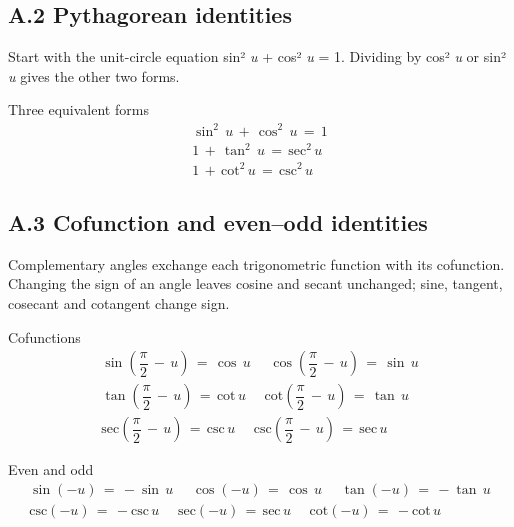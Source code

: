 \documentclass[11pt]{article}
\begin{document}
\begin{keepsection}
\section{A.2 Pythagorean identities}

Start with the unit-circle equation sin² \textit{u} + cos² \textit{u} = 1. Dividing by cos² \textit{u} or sin² \textit{u} gives the other two forms.

\begin{equationcard}{Three equivalent forms}
\[ \begin{gathered} \sin ^{2}\, {u}\, +\, \cos ^{2}\, {u}\, =\, 1 \\ 1\, +\, \tan ^{2}\, {u}\, =\, \text{sec}^{2}\, {u} \\ 1\, +\, \text{cot}^{2}\, {u}\, =\, \text{csc}^{2}\, {u} \end{gathered} \]
\end{equationcard}
\end{keepsection}

\begin{keepsection}
\section{A.3 Cofunction and even–odd identities}

Complementary angles exchange each trigonometric function with its cofunction. Changing the sign of an angle leaves cosine and secant unchanged; sine, tangent, cosecant and cotangent change sign.

\begin{equationcard}{Cofunctions}
\[ \begin{gathered} \sin \left(\dfrac{π}{2}\, -\, {u}\right)\, =\, \cos \, {u}\, \quad \, \cos \left(\dfrac{π}{2}\, -\, {u}\right)\, =\, \sin \, {u} \\ \tan \left(\dfrac{π}{2}\, -\, {u}\right)\, =\, \text{cot}\, {u}\, \quad \, \text{cot}\left(\dfrac{π}{2}\, -\, {u}\right)\, =\, \tan \, {u} \\ \text{sec}\left(\dfrac{π}{2}\, -\, {u}\right)\, =\, \text{csc}\, {u}\, \quad \, \text{csc}\left(\dfrac{π}{2}\, -\, {u}\right)\, =\, \text{sec}\, {u} \end{gathered} \]
\end{equationcard}

\begin{equationcard}{Even and odd}
\[ \begin{gathered} \sin (-{u})\, =\, -\sin \, {u}\, \quad \, \cos (-{u})\, =\, \cos \, {u}\, \quad \, \tan (-{u})\, =\, -\tan \, {u} \\ \text{csc}(-{u})\, =\, -\text{csc}\, {u}\, \quad \, \text{sec}(-{u})\, =\, \text{sec}\, {u}\, \quad \, \text{cot}(-{u})\, =\, -\text{cot}\, {u} \end{gathered} \]
\end{equationcard}
\end{keepsection}
\end{document}
